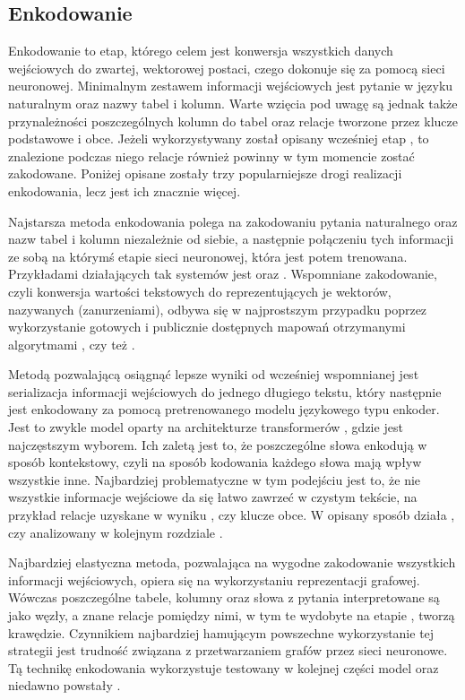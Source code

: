 \subsection{Enkodowanie}
Enkodowanie to etap, którego celem jest konwersja wszystkich danych wejściowych do zwartej, wektorowej postaci, czego dokonuje się za pomocą sieci neuronowej. Minimalnym zestawem informacji wejściowych jest pytanie w języku naturalnym oraz nazwy tabel i kolumn. Warte wzięcia pod uwagę są jednak także przynależności poszczególnych kolumn do tabel oraz relacje tworzone przez klucze podstawowe i obce. Jeżeli wykorzystywany został opisany wcześniej etap , to znalezione podczas niego relacje również powinny w tym momencie zostać zakodowane. Poniżej opisane zostały trzy popularniejsze drogi realizacji enkodowania, lecz jest ich znacznie więcej.

Najstarsza metoda enkodowania polega na zakodowaniu pytania naturalnego oraz nazw tabel i kolumn niezależnie od siebie, a następnie połączeniu tych informacji ze sobą na którymś etapie sieci neuronowej, która jest potem trenowana. Przykładami działających tak systemów jest   oraz  . Wspomniane zakodowanie, czyli konwersja wartości tekstowych do reprezentujących je wektorów, nazywanych  (zanurzeniami), odbywa się w najprostszym przypadku poprzez wykorzystanie gotowych i publicznie dostępnych mapowań otrzymanymi algorytmami  , czy też  .

Metodą pozwalającą osiągnąć lepsze wyniki od wcześniej wspomnianej jest serializacja informacji wejściowych do jednego długiego tekstu, który następnie jest enkodowany za pomocą pretrenowanego modelu językowego typu enkoder. Jest to zwykle model oparty na architekturze transformerów , gdzie   jest najczęstszym wyborem. Ich zaletą jest to, że poszczególne słowa enkodują w sposób kontekstowy, czyli na sposób kodowania każdego słowa mają wpływ wszystkie inne. Najbardziej problematyczne w tym podejściu jest to, że nie wszystkie informacje wejściowe da się łatwo zawrzeć w czystym tekście, na przykład relacje uzyskane w wyniku , czy klucze obce. W opisany sposób działa  , czy analizowany w kolejnym rozdziale  .

Najbardziej elastyczna metoda, pozwalająca na wygodne zakodowanie wszystkich informacji wejściowych, opiera się na wykorzystaniu reprezentacji grafowej. Wówczas poszczególne tabele, kolumny oraz słowa z pytania interpretowane są jako węzły, a znane relacje pomiędzy nimi, w tym te wydobyte na etapie , tworzą krawędzie. Czynnikiem najbardziej hamującym powszechne wykorzystanie tej strategii jest trudność związana z przetwarzaniem grafów przez sieci neuronowe. Tą technikę enkodowania wykorzystuje testowany w kolejnej części model   oraz niedawno powstały  . 

